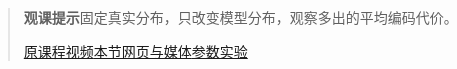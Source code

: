 \begin{quote}\small\textbf{观课提示}\quad 固定真实分布，只改变模型分布，观察多出的平均编码代价。

\href{https://www.youtube.com/watch?v=GlYgs6v2YfU}{原课程视频}\quad\href{https://vitael04213.github.io/3blue1brown-notes/lessons/cross-entropy.html}{本节网页与媒体}\quad\href{https://vitael04213.github.io/3blue1brown-notes/lab.html\#entropy}{参数实验}
\end{quote}
